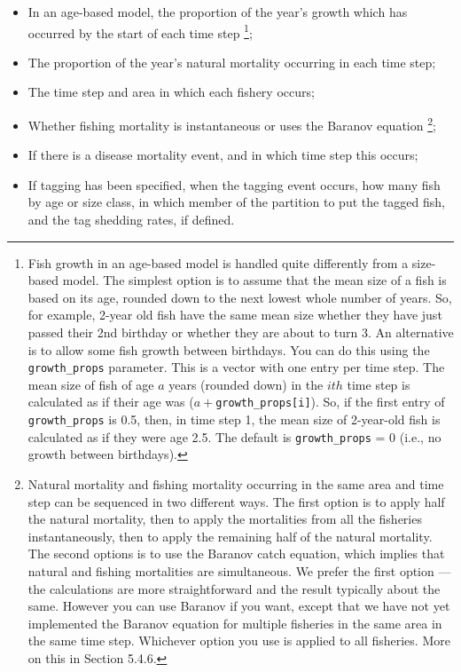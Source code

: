\begin{itemize}
\item	In an age-based model, the proportion of the year’s growth which has occurred by the start of each time step \footnote{Fish growth in an age-based model is handled quite differently from a size-based model. The simplest option is to assume that the mean size of a fish is based on its age, rounded down to the next lowest whole number of years. So, for example, 2-year old fish have the same mean size whether they have just passed their 2nd birthday or whether they are about to turn 3. An alternative is to allow some fish growth between birthdays. You can do this using the \texttt{growth\_props} parameter. This is a vector with one entry per time step. The mean size of fish of age $a$ years (rounded down) in the $ith$ time step is calculated as if their age was ($a+$\texttt{growth\_props[i]}). So, if the first entry of \texttt{growth\_props} is 0.5, then, in time step 1, the mean size of 2-year-old fish is calculated as if they were age 2.5. The default is \texttt{growth\_props} = 0 (i.e., no growth between birthdays).};
\item	The proportion of the year’s natural mortality occurring in each time step;
\item	The time step and area in which each fishery occurs;
\item Whether fishing mortality is instantaneous or uses the Baranov equation \footnote{
  Natural mortality and fishing mortality occurring in the same area and time step can be sequenced in two different ways. The first option is to apply half the natural mortality, then to apply the mortalities from all the fisheries instantaneously, then to apply the remaining half of the natural mortality. The second options is to use the Baranov catch equation, which implies that natural and fishing mortalities are simultaneous. We prefer the first option — the calculations are more straightforward and the result typically about the same. However you can use Baranov if you want, except that we have not yet implemented the Baranov equation for multiple fisheries in the same area in the same time step. Whichever option you use is applied to all fisheries. More on this in Section 5.4.6.
};
\item If there is a disease mortality event, and in which time step this occurs;
\item	If tagging has been specified, when the tagging event occurs, how many fish by age or size class, in which member of the partition to put the tagged fish, and the tag shedding rates, if defined.
\end{itemize}

